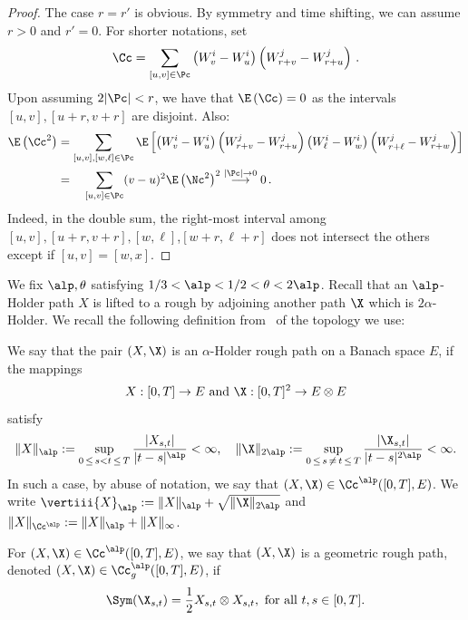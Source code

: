 \begin{proof}
The case $r=r'$ is obvious. By symmetry and time shifting, we can assume $r>0$ and $r'=0$. For shorter notations, set
\[
\Cc =\sum_{[u,v] \in \Pc} \left(W^i_v - W^i_u \right) \left(W^j_{r+v} - W^j_{r+u} \right)\,.
\]
Upon assuming $2|\Pc|<r$, we have that $\E\left(\Cc \right) = 0$ as the intervals $[u,v], [u+r, v+r]$ are disjoint. Also:
\begin{align*}
\E\left(\Cc^2 \right) &=\sum_{[u,v], [w,\ell] \in \Pc}
\E\left[\left(W^i_v - W^i_u \right) \left(W^j_{r+v} - W^j_{r+u} \right)
\left(W^i_\ell - W^i_w \right) \left(W^j_{r+\ell} - W^j_{r+w} \right)
\right]\\
&=\quad\sum_{[u,v] \in \Pc} (v-u)^2 \E\left(\Nc^2 \right)^2 \stackrel{|\Pc| \rightarrow 0}{\longrightarrow} 0 \,.
\end{align*}
Indeed, in the double sum, the right-most interval among $[u,v], [u+r, v+r], [w,\ell]$,\linebreak $[w+r, \ell+r]$ does not intersect the others except if $[u,v] = [w,x]$.
\end{proof}


We fix $\alp,\theta$ satisfying $1/3<\alp<1/2< \theta<2\alp$. Recall that an $\alp$-Holder path $X$ is lifted to a rough by adjoining another path $\X$ which is $2\alpha$-Holder. We recall the following definition from~\cite{FH14} of the topology we use:

\begin{defi}\label{def-alpha-holder}
We say that the pair $(X,\X)$ is an $\alpha$-Holder rough path on a Banach space $E$, if the mappings
\[
X:[0,T]\to E\text{ and } \X:[0,T]^2 \to E\otimes E
\]
satisfy
\begin{equation}
\Vert X\Vert_\alp:= \sup_{0\,\leq\,s<t\,\leq\,T} \frac{|X_{s,t}|}{|t-s|^\alp}<\infty,\quad \Vert \X\Vert_{2\alp}:= \sup_{0\,\leq\,s\,\neq\,t\,\leq\,T}\frac{|\X_{s,t}|}{|t-s|^{2\alp}}<\infty.
\end{equation}
In such a case, by abuse of notation, we say that $(X,\X)\in \Cc^\alp([0,T],E)$. We write $\vertiii {X }_{\alp}:=\Vert X\Vert_{\alp}+\sqrt{\Vert\X\Vert_{2\alp}}$ and $\Vert X\Vert_{\Cc^\alp}:=\Vert X\Vert_{\alp}+\Vert X\Vert_{\infty}$.

For $(X,\X)\in \Cc^\alp([0,T],E)$, we say that $(X,\X)$ is a geometric rough path, denoted $(X,\X)\in \Cc_g^\alp([0,T],E)$, if
\begin{equation}\label{def-geometric}
\Sym (\X_{s,t})= \frac{1}{2}X_{s,t}\otimes X_{s,t},\text{ for all }t,s\in [0,T].
\end{equation}
\end{defi}

